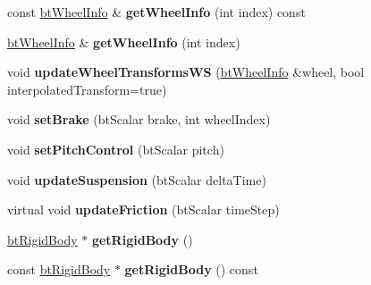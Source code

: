 \begin{DoxyCompactItemize}
\item 
\hypertarget{classbt_raycast_vehicle_a3b948c21979d339777df1dab64c9379c}{const \hyperlink{structbt_wheel_info}{bt\+Wheel\+Info} \& {\bfseries get\+Wheel\+Info} (int index) const }\label{classbt_raycast_vehicle_a3b948c21979d339777df1dab64c9379c}

\item 
\hypertarget{classbt_raycast_vehicle_a59f388ee6ccf61c43b6b19d27d3a4b9f}{\hyperlink{structbt_wheel_info}{bt\+Wheel\+Info} \& {\bfseries get\+Wheel\+Info} (int index)}\label{classbt_raycast_vehicle_a59f388ee6ccf61c43b6b19d27d3a4b9f}

\item 
\hypertarget{classbt_raycast_vehicle_a097dff14b09869992c4c2ced984305b3}{void {\bfseries update\+Wheel\+Transforms\+W\+S} (\hyperlink{structbt_wheel_info}{bt\+Wheel\+Info} \&wheel, bool interpolated\+Transform=true)}\label{classbt_raycast_vehicle_a097dff14b09869992c4c2ced984305b3}

\item 
\hypertarget{classbt_raycast_vehicle_a6b9dd519ac59a2bf326f4ff423e4ba6d}{void {\bfseries set\+Brake} (bt\+Scalar brake, int wheel\+Index)}\label{classbt_raycast_vehicle_a6b9dd519ac59a2bf326f4ff423e4ba6d}

\item 
\hypertarget{classbt_raycast_vehicle_ab37ab7f7f32f8d62222061fd114aa822}{void {\bfseries set\+Pitch\+Control} (bt\+Scalar pitch)}\label{classbt_raycast_vehicle_ab37ab7f7f32f8d62222061fd114aa822}

\item 
\hypertarget{classbt_raycast_vehicle_a6be582b77af41d8ad50369d30882776d}{void {\bfseries update\+Suspension} (bt\+Scalar delta\+Time)}\label{classbt_raycast_vehicle_a6be582b77af41d8ad50369d30882776d}

\item 
\hypertarget{classbt_raycast_vehicle_a074131752aafd9bf75b5c05411439de3}{virtual void {\bfseries update\+Friction} (bt\+Scalar time\+Step)}\label{classbt_raycast_vehicle_a074131752aafd9bf75b5c05411439de3}

\item 
\hypertarget{classbt_raycast_vehicle_af240c382a71932a3efd9a3d88895375c}{\hyperlink{classbt_rigid_body}{bt\+Rigid\+Body} $\ast$ {\bfseries get\+Rigid\+Body} ()}\label{classbt_raycast_vehicle_af240c382a71932a3efd9a3d88895375c}

\item 
\hypertarget{classbt_raycast_vehicle_aaa9173417c1c0aaa667ef3db18c3cbd7}{const \hyperlink{classbt_rigid_body}{bt\+Rigid\+Body} $\ast$ {\bfseries get\+Rigid\+Body} () const }\label{classbt_raycast_vehicle_aaa9173417c1c0aaa667ef3db18c3cbd7}


\end{DoxyCompactItemize}
